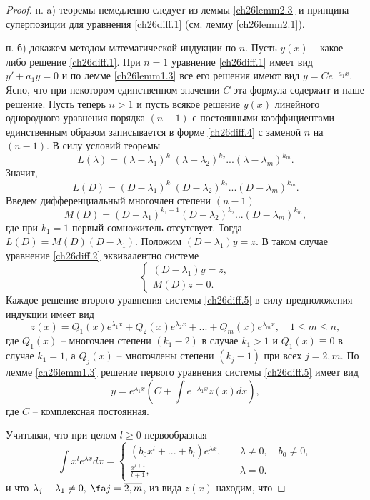 \begin{proof}

п. a) теоремы немедленно следует из леммы \ref{ch26lemm2.3} и принципа суперпозиции для уравнения \eqref{ch26diff.1} (см. лемму \ref{ch26lemm2.1}).

п. б) докажем методом математической индукции по $n$. Пусть $y(x)$ -- какое-либо решение \eqref{ch26diff.1}. При $n=1$ уравнение \eqref{ch26diff.1} имеет вид $y'+a_1y=0$  и по лемме \ref{ch26lemm1.3} все его решения имеют вид $y=Ce^{-a_1x}$. Ясно, что при некотором единственном значении $C$ эта формула содержит и наше решение. Пусть теперь $n>1$  и пусть всякое решение $y(x)$ линейного однородного уравнения порядка $(n-1)$ с постоянными коэффициентами единственным образом записывается в форме \eqref{ch26diff.4} с заменой $n$ на $(n-1)$.
В силу условий теоремы 
$$
L(\lambda)=(\lambda-\lambda_1)^{k_1}(\lambda-\lambda_2)^{k_2}...(\lambda-\lambda_m)^{k_m}.
$$
Значит,
$$
L(D)=(D-\lambda_1)^{k_1}(D-\lambda_2)^{k_2}...(D-\lambda_m)^{k_m}.
$$
Введем дифференциальный многочлен степени $(n-1)$
$$
M(D)=(D-\lambda_1)^{k_1-1}(D-\lambda_2)^{k_2}...(D-\lambda_m)^{k_m},
$$
где при $k_1=1$ первый сомножитель отсутсвует. Тогда $L(D)=M(D)(D-\lambda_1)$. Положим $(D-\lambda_1)y=z$. В таком случае уравнение \eqref{ch26diff.2} эквивалентно системе
\begin{equation}\label{ch26diff.5}
\begin{cases}
(D-\lambda_1)y=z,\\M(D)z=0.
\end{cases}
\end{equation}
Каждое решение второго уравнения системы \eqref{ch26diff.5} в силу предположения индукции имеет вид
$$
z(x)=Q_1(x)e^{\lambda_1x}+Q_2(x)e^{\lambda_2x}+...+Q_m(x)e^{\lambda_mx},\quad 1\leq m\leq n,
$$
где $Q_1(x)$ -- многочлен степени $(k_1-2)$ в случае $k_1>1$ и $Q_1(x)\equiv 0$ в случае $k_1=1$, а $Q_j(x)$ -- многочлены степени $(k_j-1)$ при всех $j=\overline{2,m}$. По лемме \ref{ch26lemm1.3} решение первого уравнения системы \eqref{ch26diff.5} имеет вид
\begin{equation}\label{ch26diff.6}
y=e^{\lambda_1x}\left(C+\int e^{-\lambda_1x} z(x) dx\right),
\end{equation}
где $C$ -- комплексная постоянная.

Учитывая, что при целом $l\geq 0$ первообразная
$$
\int x^le^{\lambda x}dx = \begin{cases}
(b_0x^l+...+b_l)e^{\lambda x},\quad &\lambda \neq 0,\quad  b_0\neq 0,\\
\frac{x^{l+1}}{l+1},\quad &\lambda=0.
\end{cases}
$$
и что $\lambda_j-\lambda_1\neq 0,\; \fa j=\overline{2,m}$, из вида $z(x)$ находим, что


\end{proof}
